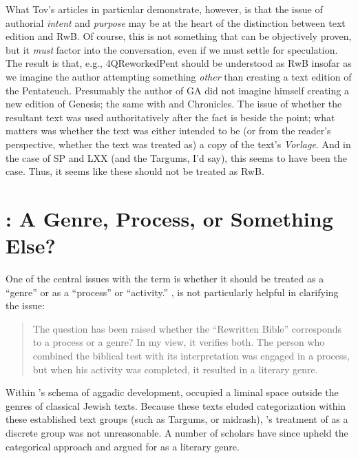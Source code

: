 What Tov's articles in particular demonstrate, however, is that the
issue of authorial \emph{intent} and \emph{purpose} may be at the heart
of the distinction between text edition and RwB. Of course, this is not
something that can be objectively proven, but it \emph{must} factor into
the conversation, even if we must settle for speculation. The result is
that, e.g., 4QReworkedPent should be understood as RwB insofar as we
imagine the author attempting something \emph{other} than creating a
text edition of the Pentateuch. Presumably the author of GA did not
imagine himself creating a new edition of Genesis; the same with
\jub and Chronicles. The issue of whether the resultant
text was used authoritatively after the fact is beside the point; what
matters was whether the text was either intended to be (or from the
reader's perspective, whether the text was treated as) a copy of the
text's \emph{Vorlage}. And in the case of SP and LXX (and the Targums,
I'd say), this seems to have been the case. Thus, it seems like these
should not be treated as RwB.

\hypertarget{rwb-a-genre-process-or-something-else}{%
\section{\RWB: A Genre, Process, or Something
Else?}\label{rwb-a-genre-process-or-something-else}}

One of the central issues with the term \RwB is whether
it should be treated as a ``genre'' or as a ``process'' or ``activity.''
\vermes, is not particularly helpful in clarifying the
issue:

\begin{quote}
The question has been raised whether the ``Rewritten Bible'' corresponds
to a process or a genre? In my view, it verifies both. The person who
combined the biblical test with its interpretation was engaged in a
process, but when his activity was completed, it resulted in a literary
genre.\autocite[8]{vermes_zsengeller2014}
\end{quote}

Within \vermes's schema of aggadic development,
\rwb occupied a liminal space outside the genres of
classical Jewish texts. Because these texts eluded categorization within
these established text groups (such as Targums, or midrash),
\vermes's treatment of \rwb as a
discrete group was not unreasonable. A number of scholars have since
upheld the categorical approach and argued for \rwb as a
literary genre.

